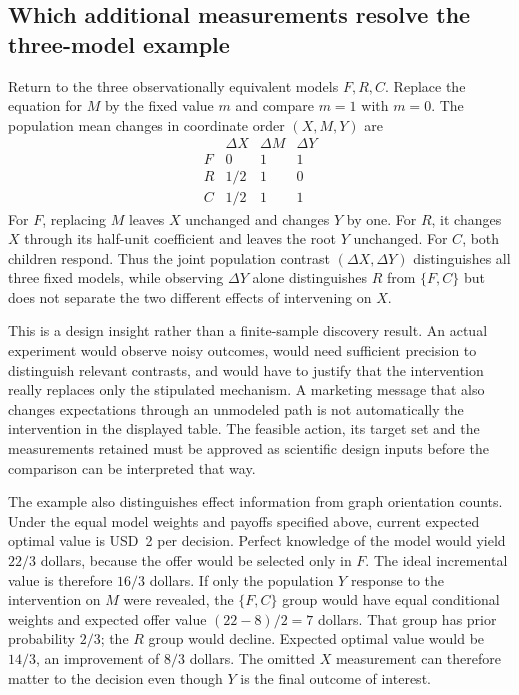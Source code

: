 \subsection{Which additional measurements resolve the three-model example}

Return to the three observationally equivalent models $F,R,C$. Replace the
equation for $M$ by the fixed value $m$ and compare $m=1$ with $m=0$.
The population mean changes in coordinate order $(X,M,Y)$ are
\[
 \begin{array}{c|ccc}
  &\Delta X&\Delta M&\Delta Y\\\hline
 F&0&1&1\\
 R&1/2&1&0\\
 C&1/2&1&1
 \end{array}
\]
For $F$, replacing $M$ leaves $X$ unchanged and changes $Y$ by one.
For $R$, it changes $X$ through its half-unit coefficient and leaves the
root $Y$ unchanged. For $C$, both children respond. Thus the joint population
contrast $(\Delta X,\Delta Y)$ distinguishes all three fixed models, while
observing $\Delta Y$ alone distinguishes $R$ from $\{F,C\}$ but does not
separate the two different effects of intervening on $X$.
\citep{exec16_s2_exact}

This is a design insight rather than a finite-sample discovery result. An
actual experiment would observe noisy outcomes, would need sufficient
precision to distinguish relevant contrasts, and would have to justify that
the intervention really replaces only the stipulated mechanism. A marketing
message that also changes expectations through an unmodeled path is not
automatically the intervention in the displayed table. The feasible action,
its target set and the measurements retained must be approved as scientific
design inputs before the comparison can be interpreted that way.

The example also distinguishes effect information from graph orientation
counts. Under the equal model weights and payoffs specified above, current
expected optimal value is USD~2 per decision. Perfect knowledge of the model
would yield $22/3$ dollars, because the offer would be selected only in $F$.
The ideal incremental value is therefore $16/3$ dollars. If only the
population $Y$ response to the intervention on $M$ were revealed, the
$\{F,C\}$ group would have equal conditional weights and expected offer
value $(22-8)/2=7$ dollars. That group has prior probability $2/3$;
the $R$ group would decline. Expected optimal value would be $14/3$,
an improvement of $8/3$ dollars. The omitted $X$ measurement can therefore
matter to the decision even though $Y$ is the final outcome of interest.
\citep{exec16_s2_exact}

